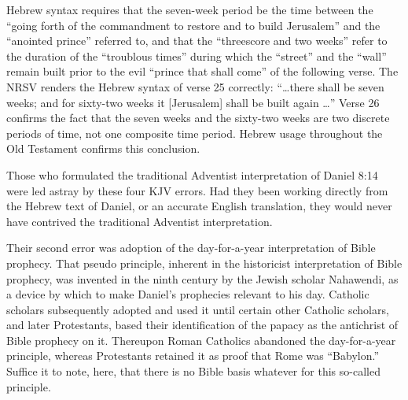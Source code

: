 Hebrew syntax requires that the seven-week period be the time between the
``going forth of the commandment to restore and to build Jerusalem'' and the
``anointed prince'' referred to, and that the ``threescore and two weeks'' refer
to the duration of the ``troublous times'' during which the ``street'' and the
``wall'' remain built prior to the evil ``prince that shall come'' of the
following verse. The NRSV renders the Hebrew syntax of verse 25 correctly:
``\ldots there shall be seven weeks; and for sixty-two weeks it [Jerusalem]
shall be built again \ldots'' Verse 26 confirms the fact that the seven weeks
and the sixty-two weeks are two discrete periods of time, not one composite
time period. Hebrew usage throughout the Old Testament confirms this
conclusion.

Those who formulated the traditional Adventist interpretation of Daniel 8:14
were led astray by these four KJV errors. Had they been working directly
from the Hebrew text of Daniel, or an accurate English translation, they
would never have contrived the traditional Adventist interpretation.

Their second error was adoption of the day-for-a-year interpretation of
Bible prophecy. That pseudo principle, inherent in the historicist
interpretation of Bible prophecy, was invented in the ninth century by the
Jewish scholar Nahawendi, as a device by which to make Daniel's prophecies
relevant to his day. Catholic scholars subsequently adopted and used it
until certain other Catholic scholars, and later Protestants, based
their identification of the papacy as the antichrist of Bible prophecy on
it. Thereupon Roman Catholics abandoned the day-for-a-year principle,
whereas Protestants retained it as proof that Rome was ``Babylon.'' Suffice it
to note, here, that there is no Bible basis whatever for this so-called
principle.

